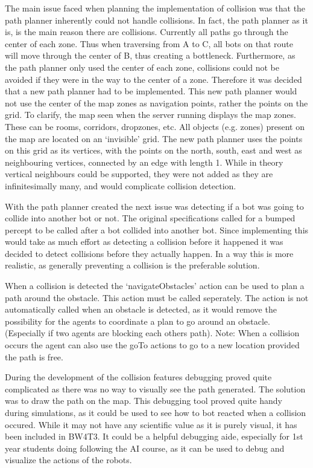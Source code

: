 The main issue faced when planning the implementation of collision was that the path planner inherently could not handle collisions. In fact, the path planner as it is, is the main reason there are collisions. Currently all paths go through the center of each zone. Thus when traversing from A to C, all bots on that route will move through the center of B, thus creating a bottleneck. Furthermore, as the path planner only used the center of each zone, collisions could not be avoided if they were in the way to the center of a zone.
Therefore it was decided that a new path planner had to be implemented. This new path planner would not use the center of the map zones as navigation points, rather the points on the grid. To clarify, the map seen when the server running displays the map zones. These can be rooms, corridors, dropzones, etc. All objects (e.g. zones) present on the map are located on an `invisible' grid. The new path planner uses the points on this grid as its vertices, with the points on the north, south, east and west as neighbouring vertices, connected by an edge with length 1. 
While in theory vertical neighbours could be supported, they were not added as they are infinitesimally many, and would complicate collision detection. 

With the path planner created the next issue was detecting if a bot was going to collide into another bot or not. The original specifications called for a bumped percept to be called after a bot collided into another bot. Since implementing this would take as much effort as detecting a collision before it happened it was decided to detect collisions before they actually happen. In a way this is more realistic, as generally preventing a collision is the preferable solution.

When a collision is detected the `navigateObstacles' action can be used to plan a path around the obstacle. This action must be called seperately. The action is not automatically called when an obstacle is detected, as it would remove the possibility for the agents to coordinate a plan to go around an obstacle. (Especially if two agents are blocking each others path). Note: When a collision occurs the agent can also use the goTo actions to go to a new location provided the path is free. 

During the development of the collision features debugging proved quite complicated as there was no way to visually see the path generated. The solution was to draw the path on the map. This debugging tool proved quite handy during simulations, as it could be used to see how to bot reacted when a collision occured. While it may not have any scientific value as it is purely visual, it has been included in BW4T3. It could be a helpful debugging aide, especially for 1st year students doing following the AI course, as it can be used to debug and visualize the actions of the robots. 

